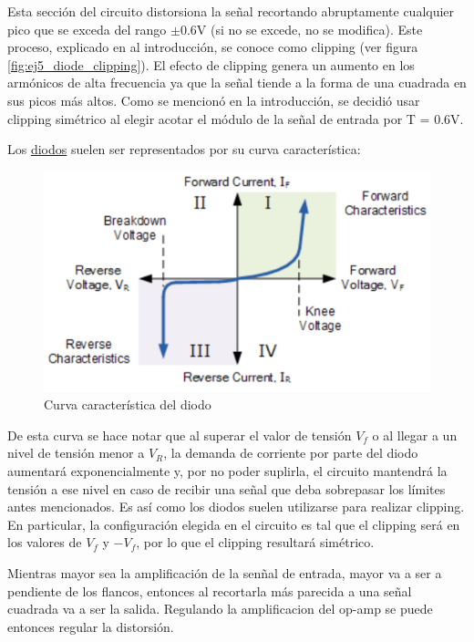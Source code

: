 \documentclass[../../main.tex]{subfiles}
\begin{document}
Esta secci\'on del circuito distorsiona la se\~nal recortando abruptamente cualquier pico que se exceda del rango $\pm$0.6V (si no se excede, no se modifica). Este proceso, explicado en al introducción, se conoce como clipping (ver figura \ref{fig:ej5_diode_clipping}).
El efecto de clipping genera un aumento en los arm\'onicos de alta frecuencia ya que la se\~nal tiende a la forma de una cuadrada en sus picos más altos. Como se mencionó en la introducción, se decidi\'o usar clipping sim\'etrico al elegir acotar el módulo de la señal de entrada por T = 0.6V.

Los \underline{diodos} suelen ser representados por su curva característica:

\begin{figure}[H]	%
	\centering
	\includegraphics[scale=0.5]{imagenes/diode_curva.png}
	\caption{Curva característica del diodo}
	\label{fig:ej5_diode_curva}
\end{figure}

De esta curva se hace notar que al superar el valor de tensión $V_f$ o al llegar a un nivel de tensión menor a $V_R$, la demanda de corriente por parte del diodo aumentará exponencialmente y, por no poder suplirla, el circuito mantendrá la tensión a ese nivel en caso de recibir una señal que deba sobrepasar los límites antes mencionados. Es así como los diodos suelen utilizarse para realizar clipping. En particular, la configuración elegida en el circuito es tal que el clipping será en los valores de $V_f$ y $-V_f$, por lo que el clipping resultará simétrico.  \par

Mientras mayor sea la amplificaci\'on de la sen\~nal de entrada, mayor va a ser a pendiente de los flancos, entonces al recortarla m\'as parecida a una se\~nal cuadrada va a ser la salida. Regulando la amplificacion del op-amp se puede entonces regular la distorsi\'on.
\end{document}
